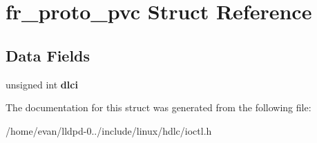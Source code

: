 \section{fr\-\_\-proto\-\_\-pvc \-Struct \-Reference}
\label{structfr__proto__pvc}
\subsection*{\-Data \-Fields}
\begin{DoxyCompactItemize}
\item 
unsigned int {\bfseries dlci}\label{structfr__proto__pvc_acf255689081f8f00cf5b1d9f6904c30f}

\end{DoxyCompactItemize}


\-The documentation for this struct was generated from the following file\-:\begin{DoxyCompactItemize}
\item 
/home/evan/lldpd-\/0../include/linux/hdlc/ioctl.\-h\end{DoxyCompactItemize}
